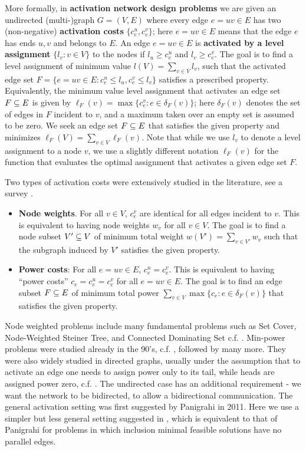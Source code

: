 \documentclass[a4paper,UKenglish,autoref]{lipics-v2019}
\begin{document}
More formally, in {\bf activation network design problems} we are given 
an undirected (multi-)graph $G=(V,E)$ where every edge $e=uv \in E$ has two (non-negative) {\bf activation costs} $\{c_e^u,c_e^v\}$;
here $e=uv \in E$ means that the edge $e$ has ends $u,v$ and belongs to $E$. 
An edge $e=uv \in E$ is {\bf activated by a level assignment} $\{l_v: v \in V\}$ to the nodes if $l_u \geq c_e^u$ and $l_v \geq c_e^v$. 
The goal is to find a level assignment of minimum value $l(V)=\sum_{v \in V} l_v$, such that 
the activated edge set $F=\{e=uv \in E:c_e^u \leq l_u, c_e^v \leq l_v\}$ satisfies a prescribed property.
Equivalently, the minimum value level assignment that activates an edge set $F \subseteq E$ is given by $\ell_F(v)=\max \{c_e^v: e \in \delta_F(v)\}$;
here $\delta_F(v)$ denotes the set of edges in $F$ incident to $v$, and a maximum taken over an empty set is assumed to be zero.
We seek an edge set $F \subseteq E$ that satisfies the given property and minimizes $\ell_F(V)=\sum_{v \in V} \ell_F(v)$.
Note that while we use $l_v$ to denote a level assignment to a node $v$, 
we use a slightly different notation $\ell_F(v)$ for the function that evaluates the optimal 
assignment that activates a given edge set $F$. 

Two types of activation costs were extensively studied in the literature, see a survey \cite{N-sur}.
\begin{itemize}
\item
{\bf Node weights}.  For all $v \in V$, $c_e^v$ are identical for all edges incident to $v$. 
This is equivalent to having node weights $w_v$ for all $v \in V$. The goal is to find a node subset
$V' \subseteq V$ of minimum total weight $w(V') = \sum_{v \in V'}w_v$ such that the subgraph induced by
$V'$ satisfies the given property.
\item
{\bf Power costs}: For all $e = uv \in E$, $c_e^u=c_e^v$.
This is equivalent to having ``power costs'' $c_e = c_e^u=c_e^v$ for all $e = uv \in E$. 
The goal is to find an edge subset $F \subseteq E$ of minimum total power 
$\sum_{v \in V} \max\{c_e:e \in \delta_F(v)\}$ that satisfies the given property.
\end{itemize}

Node weighted problems include many fundamental problems such as 
{\sc Set Cover}, {\sc Node-Weighted Steiner Tree}, and {\sc Connected Dominating Set} c.f. \cite{S,KR,GH}.
Min-power problems were studied already in the 90's, c.f. \cite{SRS,WNE,RM,KKKP}, followed by many more.
They were also widely studied in directed graphs, 
usually under the assumption that to activate an edge one needs to assign power only to its tail, 
while heads are assigned power zero, c.f. \cite{KKKP,SM,N-powcov,HKMN,N-sur}. 
The undirected case has an additional requirement - we want the network to be bidirected,
to allow a bidirectional communication.
The general activation setting was first suggested by Panigrahi \cite{P} in 2011. 
Here we use a simpler but less general setting suggested in \cite{KNS}, 
which is equivalent to that of Panigrahi \cite{P} for problems 
in which inclusion minimal feasible solutions have no parallel edges.
\end{document}
